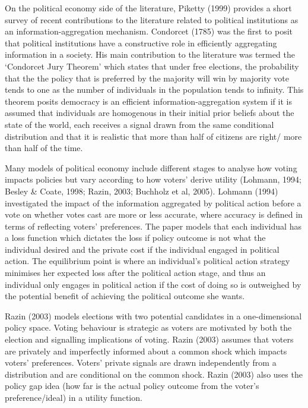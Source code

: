 \documentclass[11pt,preprint, authoryear]{elsarticle}
\numberwithin{equation}{section}
\numberwithin{figure}{section}
\numberwithin{table}{section}
\begin{document}
On the political economy side of the literature, Piketty (1999) provides
a short survey of recent contributions to the literature related to
political institutions as an information-aggregation mechanism.
Condorcet (1785) was the first to posit that political institutions have
a constructive role in efficiently aggregating information in a society.
His main contribution to the literature was termed the `Condorcet Jury
Theorem' which states that under free elections, the probability that
the the policy that is preferred by the majority will win by majority
vote tends to one as the number of individuals in the population tends
to infinity. This theorem posits democracy is an efficient
information-aggregation system if it is assumed that individuals are
homogenous in their initial prior beliefs about the state of the world,
each receives a signal drawn from the same conditional distribution and
that it is realistic that more than half of citizens are right/ more
than half of the time.

Many models of political economy include different stages to analyse how
voting impacts policies but vary according to how voters' derive utility
(Lohmann, 1994; Besley \& Coate, 1998; Razin, 2003; Buchholz et al,
2005). Lohmann (1994) investigated the impact of the information
aggregated by political action before a vote on whether votes cast are
more or less accurate, where accuracy is defined in terms of reflecting
voters' preferences. The paper models that each individual has a loss
function which dictates the loss if policy outcome is not what the
individual desired and the private cost if the individual engaged in
political action. The equilibrium point is where an individual's
political action strategy minimises her expected loss after the
political action stage, and thus an individual only engages in political
action if the cost of doing so is outweighed by the potential benefit of
achieving the political outcome she wants.

Razin (2003) models elections with two potential candidates in a
one-dimensional policy space. Voting behaviour is strategic as voters
are motivated by both the election and signalling implications of
voting. Razin (2003) assumes that voters are privately and imperfectly
informed about a common shock which impacts voters' preferences. Voters'
private signals are drawn independently from a distribution and are
conditional on the common shock. Razin (2003) also uses the policy gap
idea (how far is the actual policy outcome from the voter's
preference/ideal) in a utility function.
\end{document}
